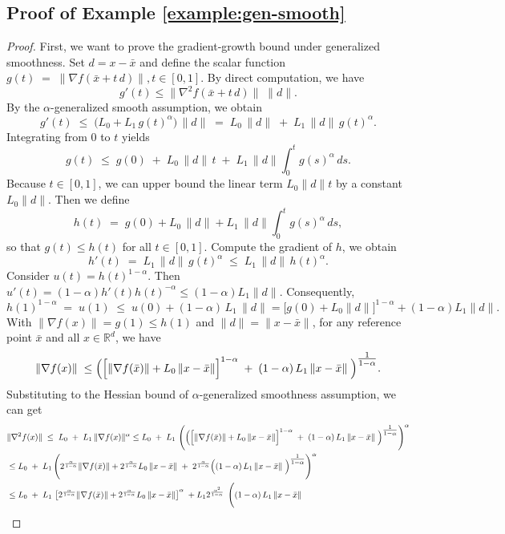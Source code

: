 \documentclass{article}
\newcommand{\RR}{\mathbb{R}}
\begin{document}
\subsection{Proof of Example \ref{example:gen-smooth}}
\label{appdx:example:gen-smooth}
\begin{proof}
    First, we want to prove the gradient‐growth bound under generalized smoothness. 
Set \(d = x - \bar x\) and define the scalar function
$g(t) \;=\; \bigl\|\nabla f(\bar x + t\,d)\bigr\|,t\in[0,1].$
By direct computation, we have 
\[
g'(t)
 \le \|\nabla^2 f(\bar x + t\,d)\|\;\|d\|.
\]
By the $\alpha$-generalized smooth assumption, we obtain
\[
g'(t)
\;\le\;\bigl(L_0 + L_1\,g(t)^\alpha\bigr)\,\|d\|
\;=\;L_0\,\|d\| \;+\; L_1\,\|d\|\,g(t)^\alpha.
\]
Integrating from \(0\) to \(t\) yields
\[
g(t)
\;\le\;g(0) \;+\; L_0\,\|d\|\,t
 \;+\; L_1\,\|d\|\int_0^t g(s)^\alpha\,ds.
\]
Because $t\in[0,1]$, we can upper bound the linear term $L_0\|d\|t$ by a constant $L_0\|d\|$. Then we define
\[
h(t) \;=\; g(0) + L_0\,\|d\|
  + L_1\,\|d\|\int_0^t g(s)^\alpha\,ds,
\]
so that \(g(t)\le h(t)\) for all \(t\in[0,1]\). Compute the gradient of $h$, we obtain
\[
h'(t) \;=\; L_1\,\|d\|\,g(t)^\alpha
\;\le\;L_1\,\|d\|\,h(t)^\alpha.
\]
Consider \(u(t)=h(t)^{1-\alpha}\).  Then $
u'(t)
=(1-\alpha)h'(t)h(t)^{-\alpha}
\le(1-\alpha)L_1\|d\|.
$
Consequently, 
\[
h(1)^{1-\alpha}
\;=\;u(1)
\;\le\;u(0)+(1-\alpha)\,L_1\,\|d\|
=\bigl[g(0)+L_0\|d\|\bigr]^{1-\alpha} + (1-\alpha)L_1\|d\|.
\]
With \(\|\nabla f(x)\| = g(1)\leq h(1)\) and \(\|d\|=\|x-\bar x\|\), for any reference point \(\bar x\) and all \(x\in\RR^d\), we have 
\[
\|\nabla f(x)\|
\;\le\;
\Bigr(\Bigl[\|\nabla f(\bar x)\| + L_0\,\|x-\bar x\|\Bigr]^{1-\alpha}
\;+\;(1-\alpha)\,L_1\,\|x-\bar x\|
\;\Bigr)^{\tfrac1{1-\alpha}}.
\]
Substituting to the Hessian bound of $\alpha$-generalized smoothness assumption, we can get
\begin{align*}
&\|\nabla^2 f(x)\|\;\le\;L_0 \;+\;L_1\,\|\nabla f(x)\|^\alpha \le 
L_0 \;+\;L_1\,\left(\Bigr(\Bigl[\|\nabla f(\bar x)\| + L_0\,\|x-\bar x\|\Bigr]^{1-\alpha}
\;+\;(1-\alpha)\,L_1\,\|x-\bar x\|
\;\Bigr)^{\tfrac1{1-\alpha}}\right)^\alpha\\
&\leq L_0 \;+\;L_1\,\Bigg(2^\frac{\alpha}{1-\alpha}\|\nabla f(\bar x)\| + 2^\frac{\alpha}{1-\alpha} L_0\,\|x-\bar x\|
\;+\;2^\frac{\alpha}{1-\alpha} \Bigr((1-\alpha)\,L_1\,\|x-\bar x\|
\;\Bigr)^{\tfrac1{1-\alpha}}\Bigg)^\alpha\\
& \leq L_0 \;+\;L_1\,\left[2^\frac{\alpha}{1-\alpha}\|\nabla f(\bar x)\| + 2^\frac{\alpha}{1-\alpha}L_0\,\|x-\bar x\|\right]^\alpha
\;+L_1 2^\frac{\alpha^2}{1-\alpha}\,\;\Biggr((1-\alpha)\,L_1\,\|x-\bar x\|

\end{align*}
\end{proof}
\end{document}
